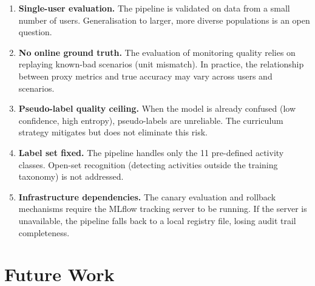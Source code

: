\begin{enumerate}
  \item \textbf{Single-user evaluation.} The pipeline is validated on data
    from a small number of users.
    Generalisation to larger, more diverse populations is an open question.

  \item \textbf{No online ground truth.} The evaluation of monitoring quality
    relies on replaying known-bad scenarios (unit mismatch).
    In practice, the relationship between proxy metrics and true accuracy
    may vary across users and scenarios.

  \item \textbf{Pseudo-label quality ceiling.} When the model is already
    confused (low confidence, high entropy), pseudo-labels are unreliable.
    The curriculum strategy mitigates but does not eliminate this risk.

  \item \textbf{Label set fixed.} The pipeline handles only the 11
    pre-defined activity classes.
    Open-set recognition (detecting activities outside the training taxonomy)
    is not addressed.

  \item \textbf{Infrastructure dependencies.} The canary evaluation and
    rollback mechanisms require the MLflow tracking server to be running.
    If the server is unavailable, the pipeline falls back to a local
    registry file, losing audit trail completeness.
\end{enumerate}

\section{Future Work}
\label{sec:future_work}


